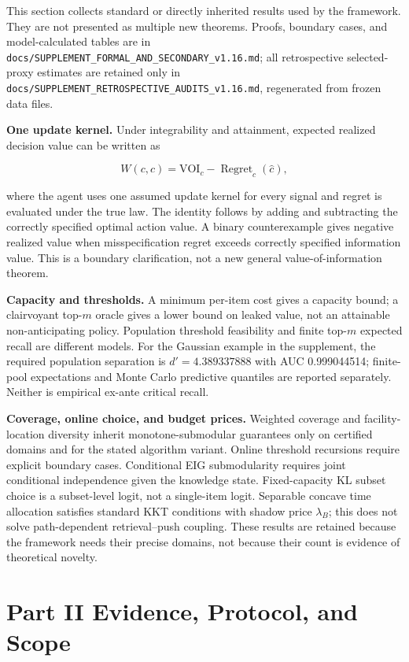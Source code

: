 \documentclass[
  11pt]{article}
\begin{document}
This section collects standard or directly inherited results used by the
framework. They are not presented as multiple new theorems. Proofs,
boundary cases, and model-calculated tables are in
\texttt{docs/SUPPLEMENT\_FORMAL\_AND\_SECONDARY\_v1.16.md}; all
retrospective selected-proxy estimates are retained only in
\texttt{docs/SUPPLEMENT\_RETROSPECTIVE\_AUDITS\_v1.16.md}, regenerated
from frozen data files.

\textbf{One update kernel.} Under integrability and attainment, expected
realized decision value can be written as

\[W(c,\hat c)=\mathrm{VOI}_c-\operatorname{Regret}_c(\hat c),\tag{7}\]

where the agent uses one assumed update kernel for every signal and
regret is evaluated under the true law. The identity follows by adding
and subtracting the correctly specified optimal action value. A binary
counterexample gives negative realized value when misspecification
regret exceeds correctly specified information value. This is a boundary
clarification, not a new general value-of-information theorem.

\textbf{Capacity and thresholds.} A minimum per-item cost gives a
capacity bound; a clairvoyant top-\(m\) oracle gives a lower bound on
leaked value, not an attainable non-anticipating policy. Population
threshold feasibility and finite top-\(m\) expected recall are different
models. For the Gaussian example in the supplement, the required
population separation is \(d'=4.389337888\) with AUC 0.999044514;
finite-pool expectations and Monte Carlo predictive quantiles are
reported separately. Neither is empirical ex-ante critical recall.

\textbf{Coverage, online choice, and budget prices.} Weighted coverage
and facility-location diversity inherit monotone-submodular guarantees
only on certified domains and for the stated algorithm variant. Online
threshold recursions require explicit boundary cases. Conditional EIG
submodularity requires joint conditional independence given the
knowledge state. Fixed-capacity KL subset choice is a subset-level
logit, not a single-item logit. Separable concave time allocation
satisfies standard KKT conditions with shadow price \(\lambda_B\); this
does not solve path-dependent retrieval--push coupling. These results
are retained because the framework needs their precise domains, not
because their count is evidence of theoretical novelty.

\section{Part II Evidence, Protocol, and
Scope}\label{part-ii-evidence-protocol-and-scope}
\end{document}
